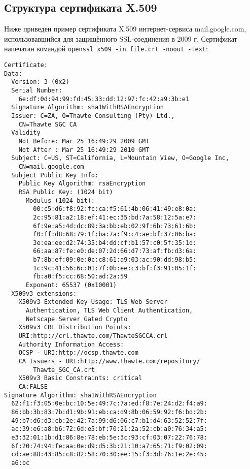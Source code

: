 \subsection{Структура сертификата X.509}

Ниже приведен пример сертификата X.509 интернет-сервиса mail.google.com, использовавшийся для защищённого SSL-соединения в 2009 г. Сертификат напечатан командой \texttt{openssl x509 -in file.crt -noout -text}:

{\small \begin{verbatim}
Certificate:
Data:
  Version: 3 (0x2)
  Serial Number:
    6e:df:0d:94:99:fd:45:33:dd:12:97:fc:42:a9:3b:e1
  Signature Algorithm: sha1WithRSAEncryption
  Issuer: C=ZA, O=Thawte Consulting (Pty) Ltd.,
    CN=Thawte SGC CA
  Validity
    Not Before: Mar 25 16:49:29 2009 GMT
    Not After : Mar 25 16:49:29 2010 GMT
  Subject: C=US, ST=California, L=Mountain View, O=Google Inc,
    CN=mail.google.com
  Subject Public Key Info:
    Public Key Algorithm: rsaEncryption
    RSA Public Key: (1024 bit)
      Modulus (1024 bit):
        00:c5:d6:f8:92:fc:ca:f5:61:4b:06:41:49:e8:0a:
        2c:95:81:a2:18:ef:41:ec:35:bd:7a:58:12:5a:e7:
        6f:9e:a5:4d:dc:89:3a:bb:eb:02:9f:6b:73:61:6b:
        f0:ff:d8:68:79:1f:ba:7a:f9:c4:ae:bf:37:06:ba:
        3e:ea:ee:d2:74:35:b4:dd:cf:b1:57:c0:5f:35:1d:
        66:aa:87:fe:e0:de:07:2d:66:d7:73:af:fb:d3:6a:
        b7:8b:ef:09:0e:0c:c8:61:a9:03:ac:90:dd:98:b5:
        1c:9c:41:56:6c:01:7f:0b:ee:c3:bf:f3:91:05:1f:
        fb:a0:f5:cc:68:50:ad:2a:59
      Exponent: 65537 (0x10001)
  X509v3 extensions:
    X509v3 Extended Key Usage: TLS Web Server
      Authentication, TLS Web Client Authentication,
      Netscape Server Gated Crypto
    X509v3 CRL Distribution Points:
    URI:http://crl.thawte.com/ThawteSGCCA.crl
    Authority Information Access:
    OCSP - URI:http://ocsp.thawte.com
    CA Issuers - URI:http://www.thawte.com/repository/
        Thawte_SGC_CA.crt
    X509v3 Basic Constraints: critical
    CA:FALSE
Signature Algorithm: sha1WithRSAEncryption
  62:f1:f3:05:0e:bc:10:5e:49:7c:7a:ed:f8:7e:24:d2:f4:a9:
  86:bb:3b:83:7b:d1:9b:91:eb:ca:d9:8b:06:59:92:f6:bd:2b:
  49:b7:d6:d3:cb:2e:42:7a:99:d6:06:c7:b1:d4:63:52:52:7f:
  ac:39:e6:a8:b6:72:6d:e5:bf:70:21:2a:52:cb:a0:76:34:a5:
  e3:32:01:1b:d1:86:8e:78:eb:5e:3c:93:cf:03:07:22:76:78:
  6f:20:74:94:fe:aa:0e:d9:d5:3b:21:10:a7:65:71:f9:02:09:
  cd:ae:88:43:85:c8:82:58:70:30:ee:15:f3:3d:76:1e:2e:45:
  a6:bc
\end{verbatim}}

